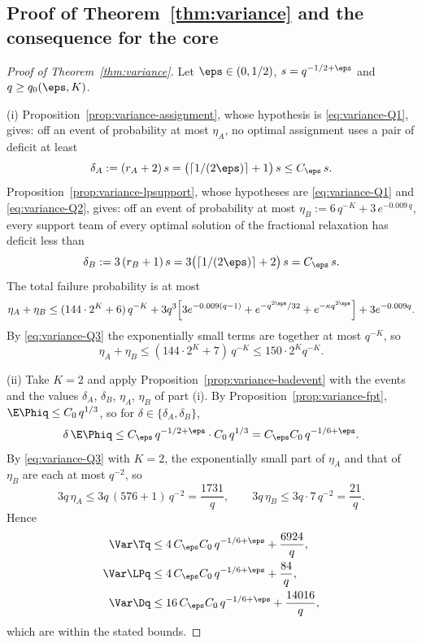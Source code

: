 \subsection{Proof of Theorem~\ref{thm:variance} and the consequence for the core}
\label{sec:variance-proof}

\begin{proof}[Proof of Theorem~\ref{thm:variance}]
Let $\eps\in(0,1/2)$, $s=q^{-1/2+\eps}$ and $q\ge q_0(\eps,K)$.

(i) Proposition~\ref{prop:variance-assignment}, whose hypothesis is
\eqref{eq:variance-Q1}, gives: off an event of probability at most $\eta_A$, no optimal
assignment uses a pair of deficit at least
\[
\delta_A:=(r_A+2)\,s=\bigl(\lceil1/(2\eps)\rceil+1\bigr)\,s\le C_\eps\,s .
\]
Proposition~\ref{prop:variance-lpsupport}, whose hypotheses are \eqref{eq:variance-Q1} and
\eqref{eq:variance-Q2}, gives: off an event of probability at most
$\eta_B:=6\,q^{-K}+3\,e^{-0.009\,q}$, every support team of every optimal solution of the
fractional relaxation has deficit less than
\[
\delta_B:=3\,(r_B+1)\,s=3\bigl(\lceil1/(2\eps)\rceil+2\bigr)\,s=C_\eps\,s .
\]
The total failure probability is at most
\[
\eta_A+\eta_B\le(144\cdot2^K+6)\,q^{-K}
+3q^3\Bigl[3e^{-0.009(q-1)}+e^{-q^{2\eps}/32}+e^{-\kappa q^{2\eps}}\Bigr]+3e^{-0.009q}.
\]
By \eqref{eq:variance-Q3} the exponentially small terms are together at most $q^{-K}$, so
\[
\eta_A+\eta_B\le(144\cdot2^K+7)\,q^{-K}\le150\cdot2^K q^{-K}.
\]

(ii) Take $K=2$ and apply Proposition~\ref{prop:variance-badevent} with the events and the
values $\delta_A$, $\delta_B$, $\eta_A$, $\eta_B$ of part (i). By
Proposition~\ref{prop:variance-fpt}, $\E\Phiq\le C_0\,q^{1/3}$, so for
$\delta\in\{\delta_A,\delta_B\}$,
\[
\delta\,\E\Phiq\le C_\eps\,q^{-1/2+\eps}\cdot C_0\,q^{1/3}=C_\eps C_0\,q^{-1/6+\eps}.
\]
By \eqref{eq:variance-Q3} with $K=2$, the exponentially small part of $\eta_A$ and that of
$\eta_B$ are each at most $q^{-2}$, so
\[
3q\,\eta_A\le3q\,(576+1)\,q^{-2}=\frac{1731}q,\qquad
3q\,\eta_B\le3q\cdot7\,q^{-2}=\frac{21}q .
\]
Hence
\begin{align*}
\Var\Tq&\le4\,C_\eps C_0\,q^{-1/6+\eps}+\frac{6924}q,\\
\Var\LPq&\le4\,C_\eps C_0\,q^{-1/6+\eps}+\frac{84}q,\\
\Var\Dq&\le16\,C_\eps C_0\,q^{-1/6+\eps}+\frac{14016}q,
\end{align*}
which are within the stated bounds.
\end{proof}

